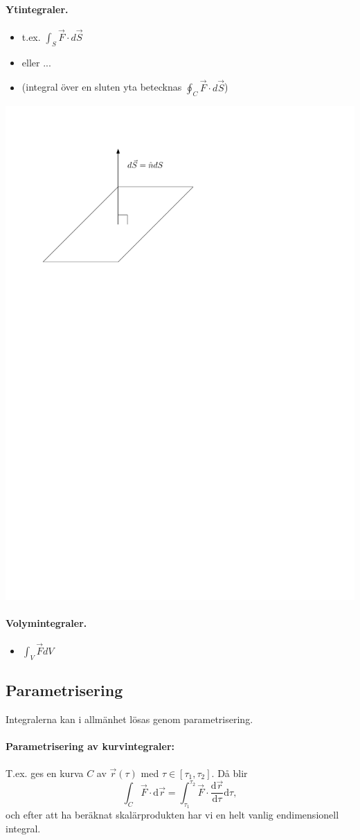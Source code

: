 \documentclass[%
oneside,                 %
final,                   %
10pt]{article}
\begin{document}
\noindent
\paragraph{Ytintegraler.}
\begin{itemize}
\item t.ex. $\int_S \vec{F} \cdot d\vec{S}$

\item eller ...

\item (integral över en sluten yta betecknas $\oint_C \vec{F} \cdot d\vec{S}$)
\end{itemize}

\noindent
\centerline{\includegraphics[width=0.4\linewidth]{fig/yta.pdf}}



\paragraph{Volymintegraler.}
\begin{itemize}
\item $\int_V \vec{F} dV$
\end{itemize}

\noindent
\subsection{Parametrisering}
Integralerna kan i allmänhet lösas genom parametrisering. 

\paragraph{Parametrisering av kurvintegraler:}
T.ex. ges en kurva $C$ av $\vec{r}(\tau)$ med $\tau \in [\tau_1,\tau_2]$. Då blir
\begin{equation}
  \int_C \vec{F}\cdot \mbox{d}\vec{r} = \int_{\tau_1}^{\tau_2} \vec{F}
\cdot \frac{\mbox{d}\vec{r}}{\mbox{d}\tau} \mbox{d}\tau,
\end{equation}
och efter att ha beräknat skalärprodukten har vi en helt vanlig endimensionell integral.
\end{document}
